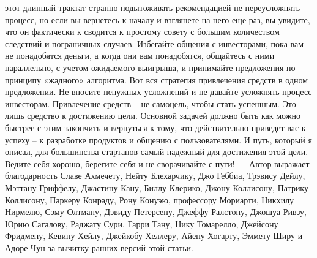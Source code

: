 \documentclass[ebook,12pt,oneside,openany]{memoir}
\begin{document}
этот длинный трактат странно подытоживать рекомендацией не
переусложнять процесс, но если вы вернетесь к началу и взглянете на
него еще раз, вы увидите, что он фактически к сводится к простому
совету с большим количеством следствий и пограничных случаев.
Избегайте общения с инвесторами, пока вам не понадобятся деньги, а
когда они вам понадобятся, общайтесь с ними параллельно, с учетом
ожидаемого выигрыша, и принимайте предложения по принципу «жадного»
алгоритма. Вот вся стратегия привлечения средств в одном предложении.
Не вносите ненужных усложнений и не давайте усложнять процесс
инвесторам. Привлечение средств – не самоцель, чтобы стать успешным.
Это лишь средство к достижению цели. Основной задачей должно быть как
можно быстрее с этим закончить и вернуться к тому, что действительно
приведет вас к успеху – к разработке продуктов и общению с
пользователями. И путь, который я описал, для большинства стартапов
самый надежный для достижения этой цели. Ведите себя хорошо, берегите
себя и не сворачивайте с пути! --- Автор выражает благодарность Славе
Ахмечету, Нейту Блехарчику, Джо Геббиа, Трэвису Дейлу, Мэттану
Гриффелу, Джастину Кану, Биллу Клерико, Джону Коллисону, Патрику
Коллисону, Паркеру Конраду, Рону Конуэю, профессору Мориарти, Никхилу
Нирмелю, Сэму Олтману, Дэвиду Петерсену, Джеффу Ралстону, Джошуа
Ривзу, Юрию Сагалову, Раджату Сури, Гарри Тану, Нику Томарелло,
Джейсону Фридмену, Кевину Хейлу, Джейкобу Хеллеру, Айену Хогарту,
Эммету Ширу и Адоре Чун за вычитку ранних версий этой статьи.
\end{document}
